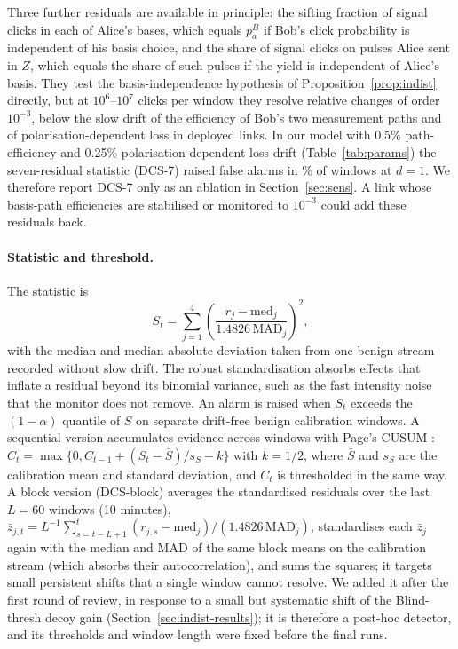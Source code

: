 Three further residuals are available in principle: the sifting fraction of signal clicks in each of Alice's bases, which equals $p^B_a$ if Bob's click probability is independent of his basis choice, and the share of signal clicks on pulses Alice sent in $Z$, which equals the share of such pulses if the yield is independent of Alice's basis. They test the basis-independence hypothesis of Proposition~\ref{prop:indist} directly, but at $10^6$--$10^7$ clicks per window they resolve relative changes of order $10^{-3}$, below the slow drift of the efficiency of Bob's two measurement paths and of polarisation-dependent loss in deployed links. In our model with 0.5\% path-efficiency and 0.25\% polarisation-dependent-loss drift (Table~\ref{tab:params}) the seven-residual statistic (DCS-7) raised false alarms in \sensNomSevenFprOne\% of windows at $d=1$. We therefore report DCS-7 only as an ablation in Section~\ref{sec:sens}. A link whose basis-path efficiencies are stabilised or monitored to $10^{-3}$ could add these residuals back.

\paragraph{Statistic and threshold.} The statistic is
\begin{equation}
S_t=\sum_{j=1}^{4}\left(\frac{r_j-\mathrm{med}_j}{1.4826\,\mathrm{MAD}_j}\right)^2,
\end{equation}
with the median and median absolute deviation taken from one benign stream recorded without slow drift. The robust standardisation absorbs effects that inflate a residual beyond its binomial variance, such as the fast intensity noise that the monitor does not remove. An alarm is raised when $S_t$ exceeds the $(1-\alpha)$ quantile of $S$ on separate drift-free benign calibration windows. A sequential version accumulates evidence across windows with Page's CUSUM \cite{page1954}: $C_t=\max\{0,C_{t-1}+(S_t-\bar S)/s_S-k\}$ with $k=1/2$, where $\bar S$ and $s_S$ are the calibration mean and standard deviation, and $C_t$ is thresholded in the same way. A block version (DCS-block) averages the standardised residuals over the last $L=60$ windows (10 minutes), $\bar z_{j,t}=L^{-1}\sum_{s=t-L+1}^{t} (r_{j,s}-\mathrm{med}_j)/(1.4826\,\mathrm{MAD}_j)$, standardises each $\bar z_j$ again with the median and MAD of the same block means on the calibration stream (which absorbs their autocorrelation), and sums the squares; it targets small persistent shifts that a single window cannot resolve. We added it after the first round of review, in response to a small but systematic shift of the Blind-thresh decoy gain (Section~\ref{sec:indist-results}); it is therefore a post-hoc detector, and its thresholds and window length were fixed before the final runs.

